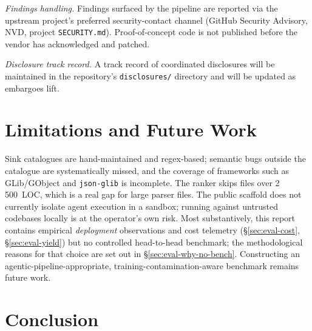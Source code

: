 \documentclass[11pt,a4paper]{article}
\begin{document}
\textit{Findings handling.} Findings surfaced by the pipeline are reported
via the upstream project's preferred security-contact channel
(GitHub Security Advisory, NVD, project \texttt{SECURITY.md}).
Proof-of-concept code is not published before the vendor has acknowledged
and patched.

\textit{Disclosure track record.} A track record of coordinated disclosures
will be maintained in the repository's \texttt{disclosures/} directory and
will be updated as embargoes lift.

\section{Limitations and Future Work}
\label{sec:limitations}

Sink catalogues are hand-maintained and regex-based; semantic bugs
outside the catalogue are systematically missed, and the coverage of
frameworks such as GLib/GObject and \texttt{json-glib} is incomplete.
The ranker skips files over 2\,500~LOC, which is a real gap for large
parser files. The public scaffold does not currently isolate agent
execution in a sandbox; running against untrusted codebases locally is at
the operator's own risk. Most substantively, this report contains
empirical \emph{deployment} observations and cost telemetry
(\S\ref{sec:eval-cost}, \S\ref{sec:eval-yield}) but no controlled
head-to-head benchmark; the methodological reasons for that choice
are set out in \S\ref{sec:eval-why-no-bench}. Constructing an
agentic-pipeline-appropriate, training-contamination-aware benchmark
remains future work.

\section{Conclusion}
\label{sec:conclusion}
\end{document}
